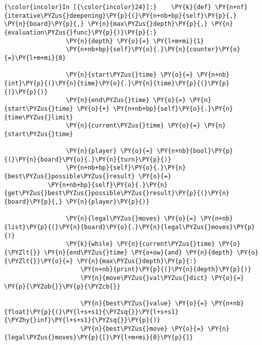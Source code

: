     \begin{Verbatim}[commandchars=\\\{\}]
{\color{incolor}In [{\color{incolor}24}]:}    \PY{k}{def} \PY{n+nf}{iterative\PYZus{}deepening}\PY{p}{(}\PY{n+nb+bp}{self}\PY{p}{,} \PY{n}{board}\PY{p}{,} \PY{n}{max\PYZus{}depth}\PY{p}{,} \PY{n}{evaluation\PYZus{}func}\PY{p}{)}\PY{p}{:}
                 \PY{n}{depth} \PY{o}{=} \PY{l+m+mi}{1}
                 \PY{n+nb+bp}{self}\PY{o}{.}\PY{n}{counter}\PY{o}{=}\PY{l+m+mi}{0}
         
                 \PY{n}{start\PYZus{}time} \PY{o}{=} \PY{n+nb}{int}\PY{p}{(}\PY{n}{time}\PY{o}{.}\PY{n}{time}\PY{p}{(}\PY{p}{)}\PY{p}{)}
                 \PY{n}{end\PYZus{}time} \PY{o}{=} \PY{n}{start\PYZus{}time} \PY{o}{+} \PY{n+nb+bp}{self}\PY{o}{.}\PY{n}{time\PYZus{}limit}
                 \PY{n}{current\PYZus{}time} \PY{o}{=} \PY{n}{start\PYZus{}time}
         
                 \PY{n}{player} \PY{o}{=} \PY{n+nb}{bool}\PY{p}{(}\PY{n}{board}\PY{o}{.}\PY{n}{turn}\PY{p}{)}
                 \PY{n+nb+bp}{self}\PY{o}{.}\PY{n}{best\PYZus{}possible\PYZus{}result} \PY{o}{=}
		 	\PY{n+nb+bp}{self}\PY{o}{.}\PY{n}{get\PYZus{}best\PYZus{}possible\PYZus{}result}\PY{p}{(}\PY{n}{board}\PY{p}{,} \PY{n}{player}\PY{p}{)}
         
                 \PY{n}{legal\PYZus{}moves} \PY{o}{=} \PY{n+nb}{list}\PY{p}{(}\PY{n}{board}\PY{o}{.}\PY{n}{legal\PYZus{}moves}\PY{p}{)}
                 \PY{k}{while} \PY{n}{current\PYZus{}time} \PY{o}{\PYZlt{}} \PY{n}{end\PYZus{}time} \PY{o+ow}{and} \PY{n}{depth} \PY{o}{\PYZlt{}}\PY{o}{=} \PY{n}{max\PYZus{}depth}\PY{p}{:}
                     \PY{n+nb}{print}\PY{p}{(}\PY{n}{depth}\PY{p}{)}
                     \PY{n}{move\PYZus{}val\PYZus{}dict} \PY{o}{=} \PY{p}{\PYZob{}}\PY{p}{\PYZcb{}}
         
                     \PY{n}{best\PYZus{}value} \PY{o}{=} \PY{n+nb}{float}\PY{p}{(}\PY{l+s+s1}{\PYZsq{}}\PY{l+s+s1}{\PYZhy{}inf}\PY{l+s+s1}{\PYZsq{}}\PY{p}{)}
                     \PY{n}{best\PYZus{}move} \PY{o}{=} \PY{n}{legal\PYZus{}moves}\PY{p}{[}\PY{l+m+mi}{0}\PY{p}{]}
         

\end{Verbatim}
